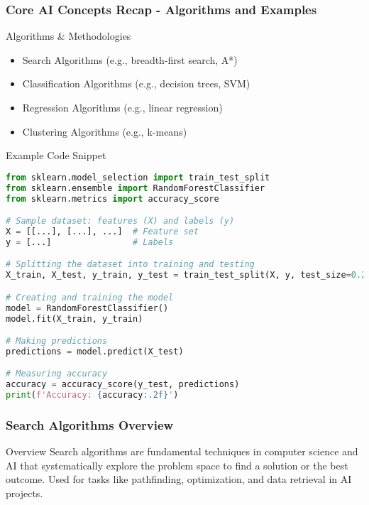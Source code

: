 \documentclass[aspectratio=169]{beamer}
\begin{document}
\begin{frame}[fragile]
    \frametitle{Core AI Concepts Recap - Algorithms and Examples}
    \begin{block}{Algorithms \& Methodologies}
        \begin{itemize}
            \item Search Algorithms (e.g., breadth-first search, A*)
            \item Classification Algorithms (e.g., decision trees, SVM)
            \item Regression Algorithms (e.g., linear regression)
            \item Clustering Algorithms (e.g., k-means)
        \end{itemize}
    \end{block}

    \begin{block}{Example Code Snippet}
    \begin{lstlisting}[language=Python]
from sklearn.model_selection import train_test_split
from sklearn.ensemble import RandomForestClassifier
from sklearn.metrics import accuracy_score

# Sample dataset: features (X) and labels (y)
X = [[...], [...], ...]  # Feature set
y = [...]                # Labels

# Splitting the dataset into training and testing
X_train, X_test, y_train, y_test = train_test_split(X, y, test_size=0.2)

# Creating and training the model
model = RandomForestClassifier()
model.fit(X_train, y_train)

# Making predictions
predictions = model.predict(X_test)

# Measuring accuracy
accuracy = accuracy_score(y_test, predictions)
print(f'Accuracy: {accuracy:.2f}')
    \end{lstlisting}
    \end{block}
\end{frame}

\begin{frame}[fragile]
    \frametitle{Search Algorithms Overview}
    \begin{block}{Overview}
        Search algorithms are fundamental techniques in computer science and AI that systematically explore the problem space to find a solution or the best outcome.
        Used for tasks like pathfinding, optimization, and data retrieval in AI projects.
    \end{block}
\end{frame}
\end{document}
